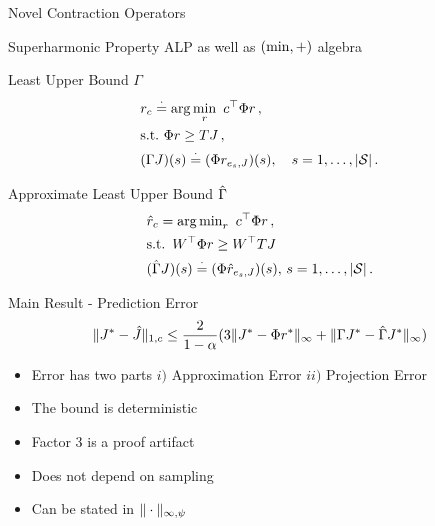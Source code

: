 \documentclass[10pt,handout]{beamer}
\begin{document}
\begin{frame}[fragile]{Novel Contraction Operators}
\begin{block}{Superharmonic Property}
ALP as well as $(\min,+)$ algebra
\end{block}
\begin{block}{Least Upper Bound $\Gamma$}
\begin{align*}
\begin{split}
&r_c\stackrel{\cdot}{=}\arg\min_{r} \,\, c^\top \Phi r\,,\\
&\text{s.t.} \mbox{ } \Phi r\geq  TJ\,,\\
&(\Gamma J)(s)\stackrel{\cdot}{=}(\Phi r_{e_s,J})(s),\quad s=1,\ldots,|\mathcal{S}|\,.
\end{split}
\end{align*}
\end{block}

\begin{block}{Approximate Least Upper Bound $\hat{\Gamma}$}
\begin{align*}
&\hat{r}_c={\arg\min}_r \,\mbox{ } c^\top \Phi r\,,\\
&\text{s.t.} \,\,\, W^\top  \Phi r\geq W^\top TJ\,\\
&(\hat{\Gamma} J)(s)\stackrel{\cdot}{=}(\Phi \hat{r}_{e_s,J})(s),\, s=1,\ldots,|\mathcal{S}|\,.
\end{align*}
\end{block}
\end{frame}


\begin{frame}[fragile]{Main Result - Prediction Error}
\begin{align*}
\|J^*-\hat{J}\|_{1,c}\leq \frac{2}{1-\alpha}( 3\|J^*-\Phi r^*\|_{\infty}+ \|\Gamma J^*-\hat{\Gamma} J^*\|_{\infty})
\end{align*}
\begin{itemize}
\item Error has two parts $i)$ Approximation Error $ii)$ Projection Error
\item The bound is deterministic
\item Factor $3$ is a proof artifact
\item Does not depend on sampling
\item Can be stated in $\|\cdot\|_{\infty,\psi}$
\end{itemize}
\end{frame}
\end{document}

